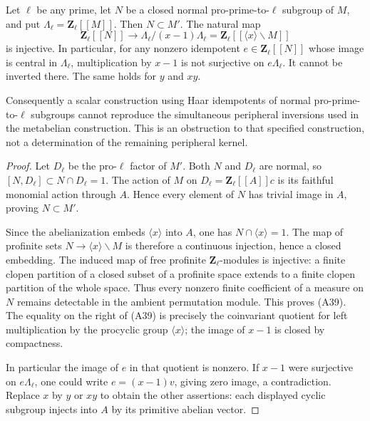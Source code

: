 \begin{proposition}
\label{A:haar-block-obstruction}
Let $\ell$ be any prime, let $N$ be a closed normal
pro-prime-to-$\ell$ subgroup of $M$, and put
$\Lambda_\ell=\mathbf Z_\ell[[M]]$.
Then $N\subset M'$. The natural map
\[
 \mathbf Z_\ell[[N]]\longrightarrow
 \Lambda_\ell/(x-1)\Lambda_\ell
       =\mathbf Z_\ell[[\langle x\rangle\backslash M]]       \tag{A39}
\]
is injective. In particular, for any nonzero
idempotent $e\in\mathbf Z_\ell[[N]]$ whose image is
central in $\Lambda_\ell$, multiplication
by $x-1$ is not surjective on $e\Lambda_\ell$.
It cannot be inverted there. The same holds for
$y$ and $xy$.

Consequently a scalar construction using Haar
idempotents of normal pro-prime-to-$\ell$ subgroups
cannot reproduce the simultaneous peripheral
inversions used in the metabelian construction.
This is an obstruction to that specified construction,
not a determination of the remaining peripheral kernel.
\end{proposition}
\begin{proof}
Let $D_\ell$ be the pro-$\ell$ factor of $M'$.
Both $N$ and $D_\ell$ are normal, so
$[N,D_\ell]\subset N\cap D_\ell=1$.
The action of $M$ on
$D_\ell=\mathbf Z_\ell[[A]]c$ is its faithful
monomial action through $A$. Hence every element
of $N$ has trivial image in $A$, proving
$N\subset M'$.

Since the abelianization embeds
$\langle x\rangle$ into $A$, one has
$N\cap\langle x\rangle=1$. The map of profinite
sets $N\to\langle x\rangle\backslash M$ is therefore
a continuous injection, hence a closed embedding.
The induced map of free profinite
$\mathbf Z_\ell$-modules is injective: a finite
clopen partition of a closed subset of a profinite
space extends to a finite clopen partition of the
whole space. Thus every nonzero finite coefficient
of a measure on $N$ remains detectable in the
ambient permutation module. This proves (A39).
The equality on the right of (A39) is precisely
the coinvariant quotient for left multiplication
by the procyclic group $\langle x\rangle$;
the image of $x-1$ is closed by compactness.

In particular the image of $e$ in that quotient
is nonzero. If $x-1$ were surjective on
$e\Lambda_\ell$, one could write
$e=(x-1)v$, giving zero image, a contradiction.
Replace $x$ by $y$ or $xy$ to obtain the other
assertions: each displayed cyclic subgroup
injects into $A$ by its primitive abelian vector.
\end{proof}

